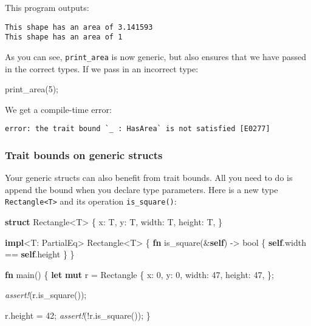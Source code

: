 \documentclass[a4paper,]{book}
\newenvironment{Shaded}{\begin{snugshade}}{\end{snugshade}}
\newcommand{\KeywordTok}[1]{\textcolor[rgb]{0.13,0.29,0.53}{\textbf{{#1}}}}
\newcommand{\DataTypeTok}[1]{\textcolor[rgb]{0.13,0.29,0.53}{{#1}}}
\newcommand{\DecValTok}[1]{\textcolor[rgb]{0.00,0.00,0.81}{{#1}}}
\newcommand{\BuiltInTok}[1]{{#1}}
\newcommand{\PreprocessorTok}[1]{\textcolor[rgb]{0.56,0.35,0.01}{\textit{{#1}}}}
\newcommand{\NormalTok}[1]{{#1}}
\begin{document}
This program outputs:

\begin{verbatim}
This shape has an area of 3.141593
This shape has an area of 1
\end{verbatim}

As you can see, \texttt{print\_area} is now generic, but also ensures
that we have passed in the correct types. If we pass in an incorrect
type:

\begin{Shaded}
\begin{Highlighting}[]
\NormalTok{print_area(}\DecValTok{5}\NormalTok{);}
\end{Highlighting}
\end{Shaded}

We get a compile-time error:

\begin{verbatim}
error: the trait bound `_ : HasArea` is not satisfied [E0277]
\end{verbatim}

\subsubsection{Trait bounds on generic
structs}\label{trait-bounds-on-generic-structs}

Your generic structs can also benefit from trait bounds. All you need to
do is append the bound when you declare type parameters. Here is a new
type \texttt{Rectangle\textless{}T\textgreater{}} and its operation
\texttt{is\_square()}:

\begin{Shaded}
\begin{Highlighting}[]
\KeywordTok{struct} \NormalTok{Rectangle<T> \{}
    \NormalTok{x: T,}
    \NormalTok{y: T,}
    \NormalTok{width: T,}
    \NormalTok{height: T,}
\NormalTok{\}}

\KeywordTok{impl}\NormalTok{<T: }\BuiltInTok{PartialEq}\NormalTok{> Rectangle<T> \{}
    \KeywordTok{fn} \NormalTok{is_square(&}\KeywordTok{self}\NormalTok{) -> }\DataTypeTok{bool} \NormalTok{\{}
        \KeywordTok{self}\NormalTok{.width == }\KeywordTok{self}\NormalTok{.height}
    \NormalTok{\}}
\NormalTok{\}}

\KeywordTok{fn} \NormalTok{main() \{}
    \KeywordTok{let} \KeywordTok{mut} \NormalTok{r = Rectangle \{}
        \NormalTok{x: }\DecValTok{0}\NormalTok{,}
        \NormalTok{y: }\DecValTok{0}\NormalTok{,}
        \NormalTok{width: }\DecValTok{47}\NormalTok{,}
        \NormalTok{height: }\DecValTok{47}\NormalTok{,}
    \NormalTok{\};}

    \PreprocessorTok{assert!}\NormalTok{(r.is_square());}

    \NormalTok{r.height = }\DecValTok{42}\NormalTok{;}
    \PreprocessorTok{assert!}\NormalTok{(!r.is_square());}
\NormalTok{\}}
\end{Highlighting}
\end{Shaded}
\end{document}
